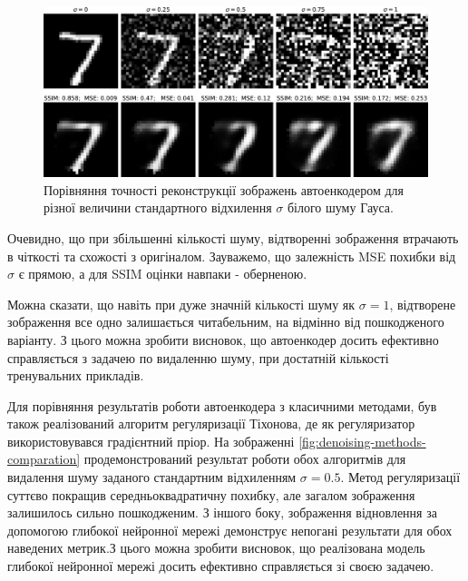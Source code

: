 \documentclass[14pt,a4paper]{extarticle}
\newcounter{e}
\numberwithin{equation}{section}
\numberwithin{figure}{section}
\begin{document}
	\begin{figure}[H]
		\centering
		\includegraphics[width=1\textwidth]{../resources/denoising-awgn-comparation.pdf}
		\caption{Порівняння точності реконструкції зображень автоенкодером для різної величини стандартного відхилення $\sigma$ білого шуму Гауса.}
		\label{fig:denoising-awgn-comparation}
	\end{figure}
	
	Очевидно, що при збільшенні кількості шуму, відтворенні зображення втрачають в чіткості та схожості з оригіналом. Зауважемо, що залежність MSE похибки від $\sigma$ є прямою, а для SSIM оцінки навпаки - оберненою. 
	
	Можна сказати, що навіть при дуже значній кількості шуму як $\sigma=1$, відтворене зображення все одно залишається читабельним, на відмінно від пошкодженого варіанту. З цього можна зробити висновок, що автоенкодер досить ефективно справляється з задачею по видаленню шуму, при достатній кількості тренувальних прикладів.
	
	Для порівняння результатів роботи автоенкодера з класичними методами, був також реалізований алгоритм регуляризації Тіхонова, де як регуляризатор використовувався градієнтний пріор. На зображенні \ref{fig:denoising-methods-comparation} продемонстрований результат роботи обох алгоритмів для видалення шуму заданого стандартним відхиленням $\sigma=0.5$. Метод регуляризації суттєво покращив середньоквадратичну похибку, але загалом зображення залишилось сильно пошкодженим. З іншого боку, зображення відновлення за допомогою глибокої нейронної мережі демонструє непогані результати для обох наведених метрик.З цього можна зробити висновок, що реалізована модель глибокої нейронної мережі досить ефективно справляється зі своєю задачею.
	
\end{document}
